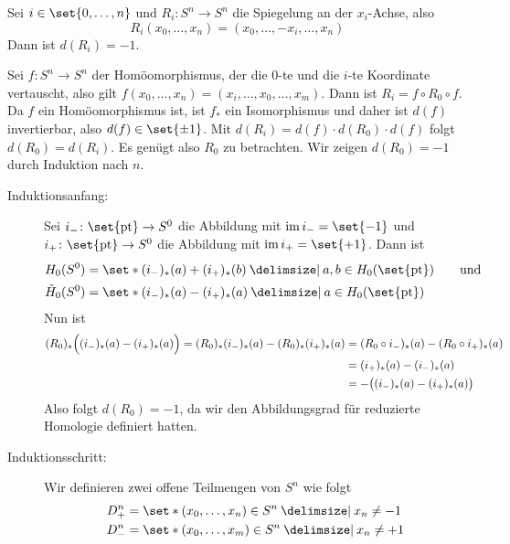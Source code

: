 \begin{beispiel}[{name=[{Abbildungsgrad der Spiegelung $R_i \colon S^n \to S^n$}]},label=bsp:105]
	Sei $i \in \set{0, \ldots ,n}$ und $R_i \colon S^n \to S^n$ die Spiegelung  an der $x_i$-Achse, also 
	\[
		R_i(x_0, \ldots , x_n) = (x_0, \ldots , - x_i, \ldots , x_n)
	\]
	Dann ist $d(R_i) = -1$.
\end{beispiel}
\begin{beweis}
	Sei $f \colon S^n \to S^n$ der Homöomorphismus, der die $0$-te und die $i$-te Koordinate vertauscht, also gilt $f(x_0, \ldots , x_n) = (x_i, \ldots , x_0, \ldots , x_m)$. 
	Dann ist $R_i = f \circ R_0 \circ f$. 
	Da $f$ ein Homöomorphismus ist, ist $f_*$ ein Isomorphismus und daher ist $d(f)$ invertierbar, also $d(f) \in \set{\pm 1}$. 
	Mit $d(R_i) = d(f) \cdot d(R_0) \cdot d(f)$ folgt $d(R_0)=d(R_i)$. 
	Es genügt also $R_0$ zu betrachten.
	Wir zeigen $d(R_0)= -1$ durch Induktion nach $n$.
	\begin{description}
		\item[Induktionsanfang:] Sei $i_- \colon \set{\mathrm{pt}} \to S^0$ die Abbildung mit $\im i_- = \set{-1}$ und $i_+ \colon\set{\mathrm{pt}} \to S^0 $ die Abbildung mit $\im i_+ = \set{+1}$. 
		Dann ist 
		\begin{align*}
			H_0(S^0) &= \set*{(i_-)_*(a)+ (i_+)_*(b) \given a,b \in H_0(\set{\mathrm{pt}})\rule{0cm}{1em}} \qquad \text{und}\\
			\tilde{H}_0(S^0) &= \set*{(i_-)_*(a)- (i_+)_*(a) \given a \in H_0(\set{\mathrm{pt}})\rule{0cm}{1em}}
		\end{align*}
		Nun ist
		\begin{align*}
			(R_0)_* \enbrace[\Big]{(i_-)_*(a)- (i_+)_*(a)} = (R_0)_* (i_-)_* (a) - (R_0)_* (i_+)_* (a) &= (R_0 \circ i_-)_*(a) - (R_0 \circ i_+)_*(a)\\ 
			&= (i_+)_*(a) - (i_-)_*(a) \\ 
			&= - \enbrace[\big]{(i_-)_*(a) - (i_+)_*(a)} 
		\end{align*}
		Also folgt $d(R_0)=-1$, da wir den Abbildungsgrad für reduzierte Homologie definiert hatten.
		\item[Induktionsschritt:] Wir definieren zwei offene Teilmengen von $S^n$ wie folgt 
		\begin{align*}
			D_+^n &= \set*{(x_0, \ldots , x_n) \in S^n \given x_n \not= -1}\\
			D_-^n &= \set*{(x_0, \ldots , x_m) \in S^n \given x_n \not= +1}  

\end{align*}
\end{description}
\end{beweis}
